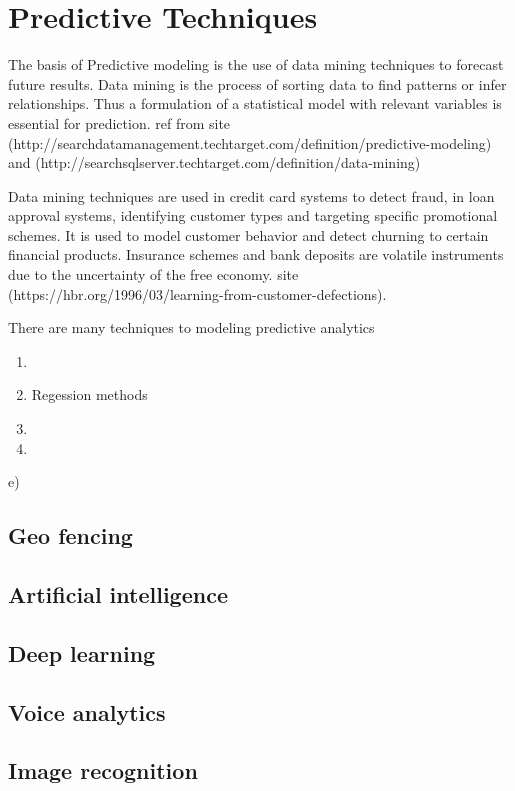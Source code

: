 \chapter{Predictive Techniques} 
\label{predictive-techniques}
The basis of Predictive modeling is the use of data mining techniques to forecast future results. Data mining is the process of sorting data to find patterns or infer relationships.
Thus a formulation of a statistical model with relevant variables is essential for prediction. 
ref from site (http://searchdatamanagement.techtarget.com/definition/predictive-modeling) and (http://searchsqlserver.techtarget.com/definition/data-mining)

Data mining techniques are used in credit card systems to detect fraud, in loan approval systems, identifying customer types and targeting specific promotional schemes. It is used to model customer behavior and detect churning to certain financial products. Insurance schemes and bank deposits are volatile instruments due to the uncertainty of the free economy. site (https://hbr.org/1996/03/learning-from-customer-defections).


There are many techniques to modeling predictive analytics 


\begin{enumerate}
	\item 
	\item Regession methods
	\item 
	\item 
\end{enumerate}e)

%
%
%
%
\section{Geo fencing}

\section{Artificial intelligence}

\section{Deep learning}

\section{Voice analytics}

\section{Image recognition}


